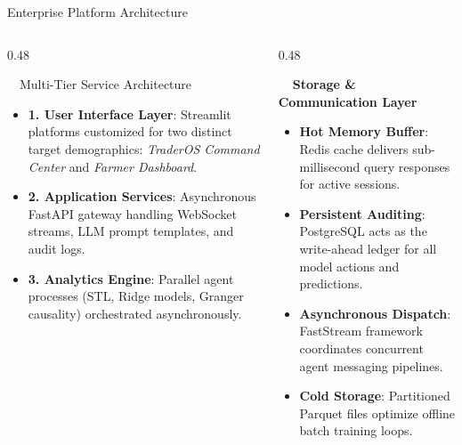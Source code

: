 \documentclass{beamer}
\begin{document}
\begin{frame}{Enterprise Platform Architecture}
\vspace{-0.2cm}

\begin{columns}[T]
    \begin{column}{0.48\textwidth}
        \begin{infocard}[height=5.2cm]{~~Multi-Tier Service Architecture}
            \fontsize{6.8pt}{8.5pt}\selectfont
            \begin{itemize}\setlength\itemsep{4.5pt}\setlength\parskip{0pt}
                \item \textbf{1. User Interface Layer}: Streamlit platforms customized for two distinct target demographics: \textit{TraderOS Command Center} and \textit{Farmer Dashboard}.
                \item \textbf{2. Application Services}: Asynchronous FastAPI gateway handling WebSocket streams, LLM prompt templates, and audit logs.
                \item \textbf{3. Analytics Engine}: Parallel agent processes (STL, Ridge models, Granger causality) orchestrated asynchronously.
            \end{itemize}
        \end{infocard}
    \end{column}
    
    \begin{column}{0.48\textwidth}
        \begin{smallcard}[0.98\textwidth, top=3pt, bottom=3pt, left=4pt, right=4pt, boxsep=0.5pt]
            \centering \textbf{\textcolor{primaryDark}{\small {}~~Storage \& Communication Layer}}
            \vspace{0.08cm}
            \fontsize{6.8pt}{8.2pt}\selectfont
            \begin{itemize}\setlength\itemsep{3.5pt}\setlength\parskip{0pt}
                \item \textbf{Hot Memory Buffer}: Redis cache delivers sub-millisecond query responses for active sessions.
                \item \textbf{Persistent Auditing}: PostgreSQL acts as the write-ahead ledger for all model actions and predictions.
                \item \textbf{Asynchronous Dispatch}: FastStream framework coordinates concurrent agent messaging pipelines.
                \item \textbf{Cold Storage}: Partitioned Parquet files optimize offline batch training loops.
            \end{itemize}
        \end{smallcard}
    \end{column}
\end{columns}


\end{frame}
\end{document}
